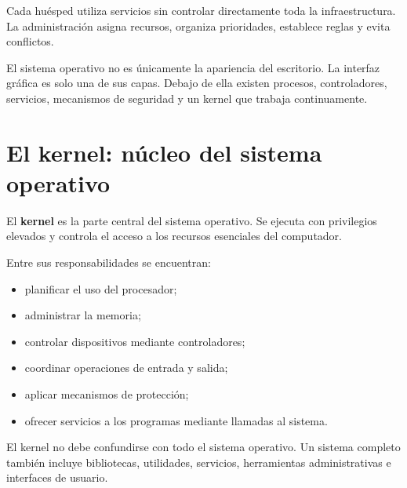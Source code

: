 \documentclass[
  spanish,
  letterpaper,
]{scrbook}
\providecommand{\tightlist}{%
  \setlength{\itemsep}{0pt}\setlength{\parskip}{0pt}}
\begin{document}
Cada huésped utiliza servicios sin controlar directamente toda la
infraestructura. La administración asigna recursos, organiza
prioridades, establece reglas y evita conflictos.

\begin{tcolorbox}[enhanced jigsaw, arc=.35mm, bottomrule=.15mm, bottomtitle=1mm, breakable, colback=white, colbacktitle=quarto-callout-important-color!10!white, colframe=quarto-callout-important-color-frame, coltitle=black, left=2mm, leftrule=.75mm, opacityback=0, opacitybacktitle=0.6, rightrule=.15mm, title=\textcolor{quarto-callout-important-color}{\faExclamation}\hspace{0.5em}{Importante}, titlerule=0mm, toprule=.15mm, toptitle=1mm]

El sistema operativo no es únicamente la apariencia del escritorio. La
interfaz gráfica es solo una de sus capas. Debajo de ella existen
procesos, controladores, servicios, mecanismos de seguridad y un kernel
que trabaja continuamente.

\end{tcolorbox}


\chapter{El kernel: núcleo del sistema
operativo}\label{el-kernel-nuxfacleo-del-sistema-operativo}

El \textbf{kernel} es la parte central del sistema operativo. Se ejecuta
con privilegios elevados y controla el acceso a los recursos esenciales
del computador.

Entre sus responsabilidades se encuentran:

\begin{itemize}
\tightlist
\item
  planificar el uso del procesador;
\item
  administrar la memoria;
\item
  controlar dispositivos mediante controladores;
\item
  coordinar operaciones de entrada y salida;
\item
  aplicar mecanismos de protección;
\item
  ofrecer servicios a los programas mediante llamadas al sistema.
\end{itemize}

El kernel no debe confundirse con todo el sistema operativo. Un sistema
completo también incluye bibliotecas, utilidades, servicios,
herramientas administrativas e interfaces de usuario.
\end{document}
